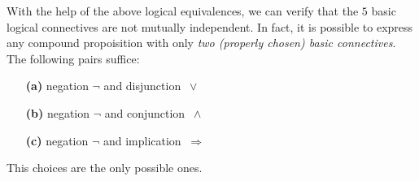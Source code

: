 \documentclass[11pt,paper=b5,footinclude,headinclude]{scrbook} %
\def\ali {{~\vee~}}
\def\inn {{~\wedge~}}
\def\sledi {{~\Rightarrow~}}
\def\cee {{~\Leftrightarrow~}}
\theoremstyle{remark}
\theoremstyle{definition} %
\theoremstyle{theorem} %
\begin{document}
%
%
%
%
%
%
%
With the help of the above logical equivalences, we can verify that the $5$ basic logical connectives are
not mutually independent.
In fact, it is possible to express any compound propoisition with only
{\em two (properly chosen) basic connectives}.
The following pairs suffice:
\begin{enumerate}
  \item[\textbf{ (a)}] negation $\neg$ and disjunction $\ali$
  \item[\textbf{ (b)}] negation $\neg$ and conjunction $\inn$
  \item[\textbf{ (c)}] negation  $\neg$ and implication $\sledi$
\end{enumerate}
This choices are the only possible ones.
\end{document}
